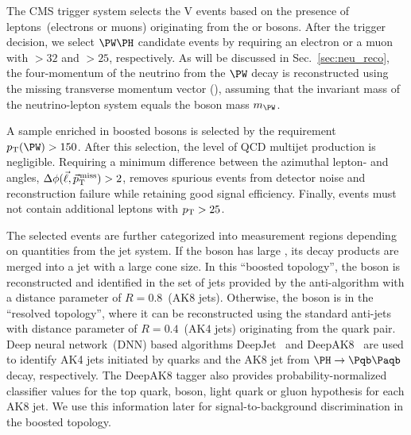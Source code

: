 \documentclass[a4paper,11pt]{article}
\newcommand{\Pb}{{{\Pqb}}\xspace}
\newcommand{\PAb}{{{{\Paqb}}}\xspace}
\renewcommand{\PV}{{{{V}}}\xspace}
\newcommand{\VH}{{{\PV}{\PH}}\xspace}
\begin{document}
The CMS trigger system selects the \VH events based on the presence of leptons~(electrons or muons) originating from the \PW or \PZ bosons.
After the trigger decision, we select $\PW\PH$ candidate events by requiring an electron or a muon with \pt$>32$ and $>25$\GeV, respectively. 
As will be discussed in Sec.~\ref{sec:neu_reco}, the four-momentum of the neutrino from the $\PW$ decay is reconstructed using the missing transverse momentum vector (\ptvecmiss), assuming that the invariant mass of the neutrino-lepton system equals the \PW boson mass $m_{\PW}$.

A sample enriched in boosted \PW bosons is selected by the requirement $\pt(\PW) > 150$\GeV. 
After this selection, the level of QCD multijet production is negligible.
Requiring a minimum difference between the azimuthal lepton- and \ptmiss angles, $\Delta\phi(\vec{\ell},{\vec p}_{\mathrm{T}}^{\kern1pt\text{miss}})>2$, removes spurious events from detector noise and reconstruction failure while retaining good signal efficiency.
Finally, %
events must not contain additional leptons with $p_{\mathrm{T}}>25$\GeV.

The selected events are further categorized into measurement regions depending on quantities from the jet system. 
If the \PH boson has large \pt, its decay products are merged into a jet with a large cone size. 
In this ``boosted topology'', the \PH boson is reconstructed and identified in the set of jets provided by the anti-\kt algorithm with a distance parameter of $R=0.8$~(AK8 jets).
Otherwise, the \PH boson is in the ``resolved topology'', 
where it can be reconstructed using the standard anti-\kt jets with distance parameter of $R=0.4$~(AK$4$ jets) originating from the \Pb quark pair. 
Deep neural network~(DNN) based algorithms DeepJet~\cite{Bols:2020bkb} and DeepAK8~\cite{Sirunyan:2020lcu} are used to identify AK4 jets initiated by \Pb quarks and the AK8 jet from $\PH \rightarrow \Pb \PAb$ decay, respectively.
The DeepAK8 tagger also provides probability-normalized classifier values for the top quark, \PW boson, light quark or gluon hypothesis for each AK8 jet. 
We use this information later for signal-to-background discrimination in the boosted topology. %
\end{document}
